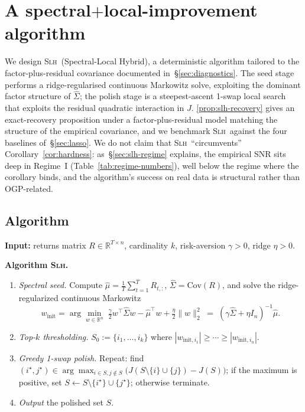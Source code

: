 
\section{A spectral$+$local-improvement algorithm}
\label{sec:slh}

We design \textsc{Slh}\ (Spectral-Local Hybrid), a deterministic algorithm tailored
to the factor-plus-residual covariance documented in~\S\ref{sec:diagnostics}. The seed
stage performs a ridge-regularised continuous Markowitz solve, exploiting the dominant
factor structure of $\hat\Sigma$; the polish stage is a steepest-ascent 1-swap local
search that exploits the residual quadratic interaction in $J$. \cref{prop:slh-recovery}
gives an exact-recovery proposition under a factor-plus-residual model matching the
structure of the empirical covariance, and we benchmark \textsc{Slh}\ against the four
baselines of~\S\ref{sec:lasso}. We do not claim that \textsc{Slh}\ ``circumvents''
Corollary~\ref{cor:hardness}: as~\S\ref{sec:slh-regime} explains, the empirical SNR sits
deep in Regime~I (Table~\ref{tab:regime-numbers}), well below the regime where the
corollary binds, and the algorithm's success on real data is structural rather than
OGP-related.

\subsection{Algorithm}\label{sec:slh-algorithm}

\medskip
\noindent\textbf{Input:} returns matrix $R\in\mathbb R^{T\times n}$, cardinality $k$,
risk-aversion $\gamma>0$, ridge $\eta>0$.

\medskip
\noindent\textbf{Algorithm \textsc{Slh}.}
\begin{enumerate}\itemsep=3pt
  \item[(S1)] \emph{Spectral seed.} Compute $\hat\mu = \frac{1}{T}\sum_{t=1}^T R_{t,:}$,
        $\hat\Sigma = \mathrm{Cov}(R)$, and solve the ridge-regularized continuous Markowitz
        \[
          w_{\mathrm{init}} = \arg\min_{w\in\mathbb R^n}\;
            \tfrac{\gamma}{2} w^\top\hat\Sigma w - \hat\mu^\top w + \tfrac{\eta}{2}\|w\|_2^2
          \;=\; (\gamma\hat\Sigma + \eta I_n)^{-1}\hat\mu.
        \]
  \item[(S2)] \emph{Top-$k$ thresholding.} $S_0 := \{i_1,\dots,i_k\}$ where $|w_{\mathrm{init},i_1}|\ge\cdots\ge|w_{\mathrm{init},i_n}|$.
  \item[(S3)] \emph{Greedy 1-swap polish.} Repeat:
        find $(i^\star,j^\star)\in\arg\max_{i\in S, j\notin S} \big(J(S\!\setminus\!\{i\}\!\cup\!\{j\}) - J(S)\big)$;
        if the maximum is positive, set $S\leftarrow S\setminus\{i^\star\}\cup\{j^\star\}$;
        otherwise terminate.
  \item[(S4)] \emph{Output} the polished set $S$.
\end{enumerate}

